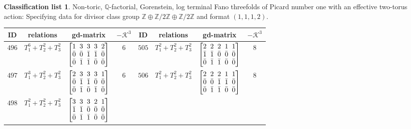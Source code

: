 \documentclass[pdftex]{sigma}%
\theoremstyle{definition}
\newtheorem{class-list}[thm]{Classification list}
\def\ZZ{{\mathbb Z}}
\def\QQ{{\mathbb Q}}
\numberwithin{equation}{section}
\begin{document}
\begin{class-list}
Non-toric, $\QQ$-factorial, Gorenstein, log terminal Fano
threefolds of Picard number one with an effective two-torus action:
Specifying data for divisor class group $
\ZZ\oplus \ZZ/2\ZZ\oplus \ZZ/2\ZZ$ and format $(1,1,1,2)$.
\begin{table}[h!]\centering\setlength{\tabcolsep}{3.5pt}
\renewcommand{\arraystretch}{1.15}\small\tabulinesep=1mm
\begin{tabu}{c|c|c|c||c|c|c|c}
\hline
ID&relations&gd-matrix&$-\mathcal{K}^3$&ID&relations&gd-matrix&$-\mathcal{K}^3$
\\
\hline
${496}$&${T_{1}^{6}+T_{2}^{2}+T_{3}^{2}}$
&$\arraycolsep=1mm\begin{bmatrix}{1} & {3} & {3} & {3} & {2} \\ {\bar{0}} & {\bar{0}} & {\bar{1}} & {\bar{1}} & {\bar{0}} \\ {\bar{0}} & {\bar{1}} & {\bar{1}} & {\bar{0}} & {\bar{0}}\end{bmatrix}$
&${6}$
&${505}$&${T_{1}^{2}+T_{2}^{2}+T_{3}^{2}}$
&$\arraycolsep=1mm\begin{bmatrix}{2} & {2} & {2} & {1} & {1} \\ {\bar{1}} & {\bar{1}} & {\bar{0}} & {\bar{0}} & {\bar{0}} \\ {\bar{0}} & {\bar{1}} & {\bar{1}} & {\bar{0}} & {\bar{0}}\end{bmatrix}$
&${8}$
\\
\hline
${497}$&${T_{1}^{3}+T_{2}^{2}+T_{3}^{2}}$
&$\arraycolsep=1mm\begin{bmatrix}{2} & {3} & {3} & {3} & {1} \\ {\bar{0}} & {\bar{1}} & {\bar{1}} & {\bar{0}} & {\bar{0}} \\ {\bar{0}} & {\bar{1}} & {\bar{0}} & {\bar{1}} & {\bar{0}}\end{bmatrix}$
&${6}$
&${506}$&${T_{1}^{2}+T_{2}^{2}+T_{3}^{2}}$
&$\arraycolsep=1mm\begin{bmatrix}{2} & {2} & {2} & {1} & {1} \\ {\bar{0}} & {\bar{0}} & {\bar{1}} & {\bar{1}} & {\bar{0}} \\ {\bar{0}} & {\bar{1}} & {\bar{1}} & {\bar{0}} & {\bar{0}}\end{bmatrix}$
&${8}$
\\
\hline
${498}$&${T_{1}^{2}+T_{2}^{2}+T_{3}^{2}}$
&$\arraycolsep=1mm\begin{bmatrix}{3} & {3} & {3} & {2} & {1} \\ {\bar{1}} & {\bar{1}} & {\bar{0}} & {\bar{0}} & {\bar{0}} \\ {\bar{0}} & {\bar{1}} & {\bar{1}} & {\bar{0}} & {\bar{0}}\end{bmatrix}$

\end{tabu}
\end{table}
\end{class-list}
\end{document}
